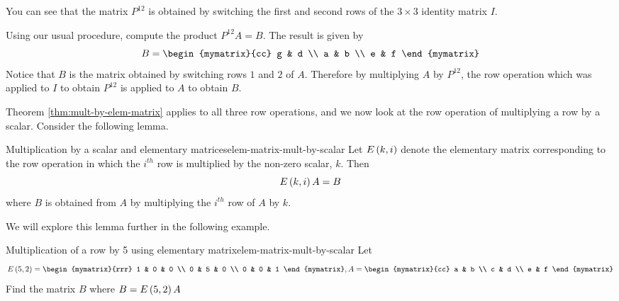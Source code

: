 \begin{solution}
You can see that the matrix $P^{12}$ is obtained by switching the first and second rows of the $3 \times 3$ identity matrix $I$.

Using our usual procedure, compute the product $P^{12}A = B$. The result is given by
\begin{equation*}
B =\begin{mymatrix}{cc}
g & d \\
a & b \\
e & f
\end{mymatrix}
\end{equation*}
Notice that $B$ is the matrix obtained by switching rows $1$ and $2$ of $A$. Therefore by  multiplying 
$A$ by $P^{12}$, the row operation which was applied to $I$ to obtain $P^{12}$ is applied to $A$ to obtain $B$. 
\end{solution}

Theorem \ref{thm:mult-by-elem-matrix} applies to all three row operations, and we now 
look at the row operation of multiplying a row by a scalar.  Consider the following lemma.

\begin{lemma}{Multiplication by a scalar and elementary matrices}{elem-matrix-mult-by-scalar}
Let $E\left(k,i\right) $ denote the elementary matrix
corresponding to the row operation in which the $i^{th}$ row is multiplied
by the non-zero scalar, $k$.  Then
\begin{equation*}
E\left(k,i\right) A=B
\end{equation*}
where $B$ is obtained from $A$ by multiplying the $i^{th}$ row of $A$ by $k$.
\end{lemma}

We will explore this lemma further in the following example.

\begin{example}{Multiplication of a row by 5 using elementary matrix}{elem-matrix-mult-by-scalar}
Let
\begin{equation*}
E \tup{5, 2} = \begin{mymatrix}{rrr}
1 & 0 & 0 \\
0 & 5 & 0 \\
0 & 0 & 1
\end{mymatrix}, A =  \begin{mymatrix}{cc}
a & b \\
c & d \\
e & f
\end{mymatrix}
\end{equation*}
Find the matrix $B$ where $B = E \left(5, 2\right)A$
\end{example}

